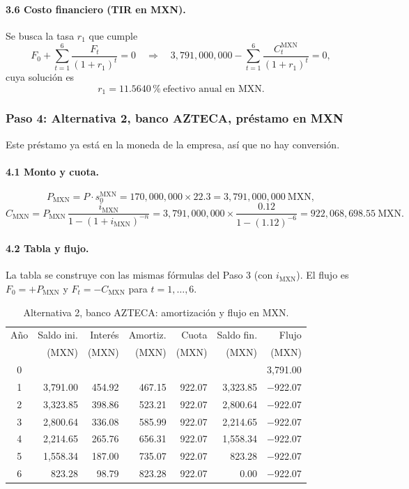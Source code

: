 \documentclass[11pt]{article}
\newcommand{\pc}{\text{\%}}
\begin{document}
\paragraph{3.6 Costo financiero (TIR en MXN).} Se busca la tasa $r_1$ que cumple
\[
F_0+\sum_{t=1}^{6}\frac{F_t}{(1+r_1)^{t}}=0
\quad\Longrightarrow\quad
3{,}791{,}000{,}000-\sum_{t=1}^{6}\frac{C^{\text{MXN}}_t}{(1+r_1)^{t}}=0 ,
\]
cuya soluci\'on es
\[
r_1=11.5640\,\pc\ \text{efectivo anual en MXN.}
\]

\subsubsection*{Paso 4: Alternativa 2, banco AZTECA, pr\'estamo en MXN}

Este pr\'estamo ya est\'a en la moneda de la empresa, as\'i que no hay conversi\'on.

\paragraph{4.1 Monto y cuota.}
\[
P_{\text{MXN}}=P\cdot s^{\text{MXN}}_0=170{,}000{,}000\times 22.3=3{,}791{,}000{,}000\ \text{MXN},
\]
\[
C_{\text{MXN}}=P_{\text{MXN}}\,\frac{i_{\text{MXN}}}{1-(1+i_{\text{MXN}})^{-n}}=3{,}791{,}000{,}000\times\frac{0.12}{1-(1.12)^{-6}}=922{,}068{,}698.55\ \text{MXN.}
\]

\paragraph{4.2 Tabla y flujo.} La tabla se construye con las mismas f\'ormulas del Paso 3 (con $i_{\text{MXN}}$). El flujo es $F_0=+P_{\text{MXN}}$ y $F_t=-C_{\text{MXN}}$ para $t=1,\dots,6$.

\begin{table}[H]\centering\small
\caption{Alternativa 2, banco AZTECA: amortizaci\'on y flujo en MXN.}\label{tab:a2}
\begin{tabular}{c r r r r r r}\toprule
Año & Saldo ini. & Interés & Amortiz. & Cuota & Saldo fin. & Flujo\\
& (MXN) & (MXN) & (MXN) & (MXN) & (MXN) & (MXN)\\\midrule
0 & & & & & & 3{,}791.00\\
1 & 3{,}791.00 & 454.92 & 467.15 & 922.07 & 3{,}323.85 & $-$922.07\\
2 & 3{,}323.85 & 398.86 & 523.21 & 922.07 & 2{,}800.64 & $-$922.07\\
3 & 2{,}800.64 & 336.08 & 585.99 & 922.07 & 2{,}214.65 & $-$922.07\\
4 & 2{,}214.65 & 265.76 & 656.31 & 922.07 & 1{,}558.34 & $-$922.07\\
5 & 1{,}558.34 & 187.00 & 735.07 & 922.07 & 823.28 & $-$922.07\\
6 & 823.28 & 98.79 & 823.28 & 922.07 & 0.00 & $-$922.07\\
\bottomrule\end{tabular}
\par{}\end{table}
\end{document}
